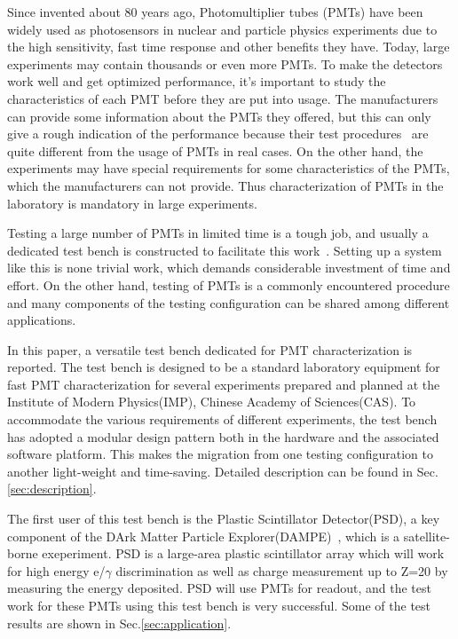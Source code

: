 \documentclass[preprint, times]{elsarticle}
\begin{document}
Since invented about 80 years ago, Photomultiplier tubes (PMTs) have been widely used as photosensors in nuclear and particle physics experiments due to the high sensitivity, fast time response and other benefits they have. 
Today, large experiments may contain thousands or even more PMTs. To make the detectors work well and get optimized performance, it's important to study the characteristics of each PMT before they are put into usage. 
The manufacturers can provide some information about the PMTs they offered, but this can only give a rough indication of the performance because their test procedures~\cite{hamamatsu} are quite different from the usage of PMTs in real cases. 
On the other hand, the experiments may have special requirements for some characteristics of the PMTs, which the manufacturers can not provide. 
Thus characterization of PMTs in the laboratory is mandatory in large experiments.

Testing a large number of PMTs in limited time is a tough job, and usually a dedicated test bench is constructed to facilitate this work~\cite{barnhill_testing_2008,akgun_complete_2005,adragna_pmt-block_2006}.
Setting up a system like this is none trivial work, which demands considerable investment of time and effort.
On the other hand, testing of PMTs is a commonly encountered procedure and many components of the testing configuration can be shared among different applications.

In this paper, a versatile test bench dedicated for PMT characterization is reported.
The test bench is designed to be a standard laboratory equipment for fast PMT characterization for several experiments prepared and planned at the Institute of Modern Physics(IMP), Chinese Academy of Sciences(CAS).
To accommodate the various requirements of different experiments, the test bench has adopted a modular design pattern both in the hardware and the associated software platform.
This makes the migration from one testing configuration to another light-weight and time-saving.
Detailed description can be found in Sec.\ref{sec:description}.

The first user of this test bench is the Plastic Scintillator Detector(PSD), a key component of the DArk Matter Particle Explorer(DAMPE)~\cite{Chang_Jin_dampe}, which is a satellite-borne exeperiment. 
PSD is a large-area plastic scintillator array which will work for high energy e/$\gamma$ discrimination as well as charge measurement up to Z=20 by measuring the energy deposited.
PSD will use PMTs for readout, and the test work for these PMTs using this test bench is very successful. Some of the test results are shown in Sec.\ref{sec:application}.
\end{document}
